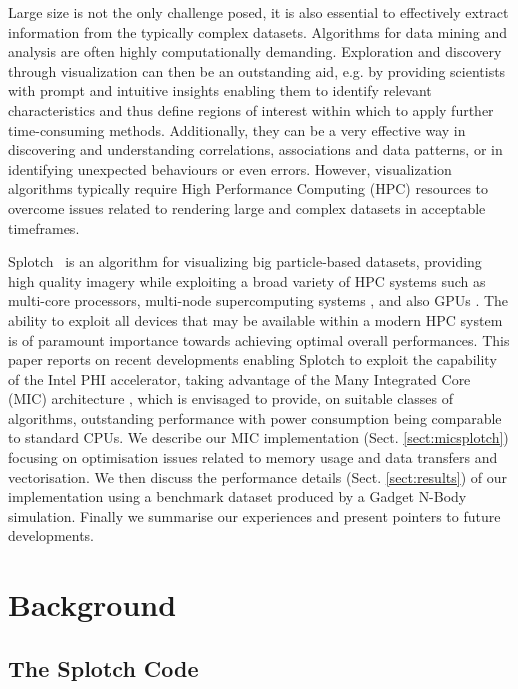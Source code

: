 \documentclass[runningheads,a4paper]{llncs}
\begin{document}
Large size is not the only challenge posed, it is also essential to effectively extract information from the typically complex datasets. 
Algorithms for data mining and analysis are often highly computationally demanding.
Exploration and discovery through visualization can then be an outstanding aid,
e.g. by providing scientists with prompt and intuitive insights enabling them to identify relevant characteristics and thus
define regions of interest within which to apply further time-consuming methods. Additionally, they can be a very effective
way in discovering and understanding correlations, associations and data patterns, or in identifying unexpected behaviours or
even errors. However, visualization algorithms typically require High Performance Computing (HPC) resources to overcome issues
related to rendering large and complex datasets in acceptable timeframes.

Splotch~\cite{splotch} is an algorithm for visualizing big particle-based datasets, providing high quality imagery while exploiting
a broad variety of HPC systems such as multi-core processors, multi-node supercomputing systems \cite{splotchmulti}, and
also GPUs \cite{splotchgpu}. The ability to exploit all devices that may be available within a modern HPC system is of paramount
importance towards achieving optimal overall performances. This paper reports on recent developments enabling Splotch to
exploit the capability of the Intel PHI \cite{xeonphi} accelerator, taking advantage of the Many Integrated Core (MIC)
architecture \cite{mic}, which is envisaged to provide, on suitable classes of algorithms, outstanding performance with power
consumption being comparable to standard CPUs. 
We describe our MIC implementation (Sect. \ref{sect:micsplotch}) focusing on optimisation issues related to memory usage and data transfers and vectorisation. We then discuss the performance details (Sect. \ref{sect:results}) of our implementation using a benchmark dataset produced by a Gadget \cite{gadget} N-Body simulation. 
Finally we summarise our experiences and present pointers to future developments.

\section{Background}
\label{sect:background}

\subsection{The Splotch Code}
\label{sect:splotchcode}
\end{document}
